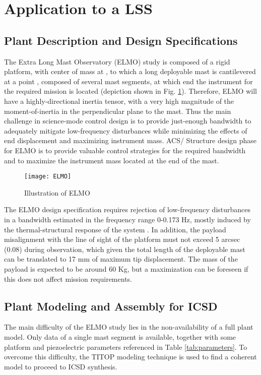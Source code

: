 \documentclass{ifacconf}
\begin{document}
\section{Application to a LSS}

\subsection{Plant Description and Design Specifications}

The Extra Long Mast Observatory (ELMO) study is composed of a rigid platform, with center of mass at , to which a long deployable mast is cantilevered at a point , composed of several mast segments, at which end the instrument for the required mission is located (depiction shown in  Fig. \ref{fig:elmo}). Therefore, ELMO will have a highly-directional inertia tensor, with a very high magnitude of the moment-of-inertia in the perpendicular plane to the mast. Thus the main challenge in science-mode control design is to provide just-enough bandwidth to adequately mitigate low-frequency disturbances while minimizing the effects of end displacement and maximizing instrument mass. ACS/ Structure design phase for ELMO is to provide valuable control strategies for the required bandwidth and to maximize the instrument mass located at the end of the mast.

\begin{figure} 
\centering
\texttt{[image: ELMO]}
\caption{Illustration of ELMO}
\label{fig:elmo}
\end{figure}

The ELMO design specification requires rejection of low-frequency disturbances in a bandwidth estimated in the frequency range 0-0.173 Hz, mostly induced by the thermal-structural response of the system \citep{Park2002_SC}. In addition, the payload misalignment with the line of sight of the platform must not exceed 5 arcsec (0.08) during observation, which given the total length of the deployable mast can be translated to 17 mm of maximum tip displacement. The mass of the payload is expected to be around 60 Kg, but a maximization can be foreseen if this does not affect mission requirements.


\subsection{Plant Modeling and Assembly for ICSD}

The main difficulty of the ELMO study lies in the non-availability of a full plant model. Only data of a single mast segment is available, together with some platform and piezoelectric parameters referenced in Table \ref{tab:parameters}. To overcome this difficulty, the TITOP modeling technique is used to find a coherent model to proceed to ICSD synthesis.
\end{document}
